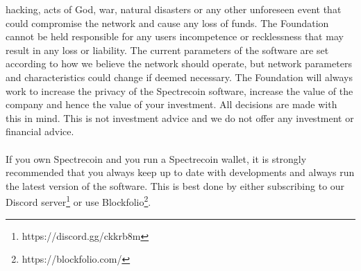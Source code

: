 hacking, acts of God, war, natural disasters or any other unforeseen event
that could compromise the network and cause any loss of funds. The Foundation
cannot be held responsible for any users incompetence or recklessness that may
result in any loss or liability. The current parameters of the software are set
according to how we believe the network should operate, but network parameters
and characteristics could change if deemed necessary. The Foundation will always
work to increase the privacy of the Spectrecoin software, increase the value of
the company and hence the value of your investment. All decisions are made with
this in mind. This is not investment advice and we do not offer any investment
or financial advice.
\\
\\
If you own Spectrecoin and you run a Spectrecoin wallet, it is strongly
recommended that you always keep up to date with developments and always run
the latest version of the software. This is best done by either subscribing
to our Discord server\footnote{https://discord.gg/ckkrb8m} or use 
Blockfolio\footnote{https://blockfolio.com/}.
